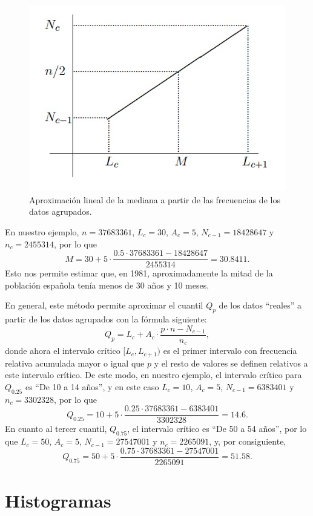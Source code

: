 \documentclass[]{book}
\theoremstyle{definition}
\theoremstyle{definition}
\theoremstyle{definition}
\theoremstyle{remark}
\begin{document}
\begin{figure}

{\centering \includegraphics[width=0.6\linewidth]{AprendeR-Parte-I_files/figure-html/median} 

}

\caption{Aproximación lineal de la mediana a partir de las frecuencias de los datos agrupados.}\label{fig:median}
\end{figure}

En nuestro ejemplo, \(n=37683361\), \(L_c=30\), \(A_c=5\), \(N_{c-1}=18428647\) y \(n_c=2455314\), por lo que
\[
M=30+5\cdot\frac{0.5\cdot 37683361-18428647}{2455314}= 30.8411.
\]
Esto nos permite estimar que, en 1981, aproximadamente la mitad de la población española tenía menos de 30 años y 10 meses.

En general, este método permite aproximar el cuantil \(Q_p\) de los datos ``reales'' a partir de los datos agrupados con la fórmula siguiente:
\[
Q_{p} =L_c + A_c \cdot \frac{p\cdot n-N_{c-1}}{n_c},
\]
donde ahora el intervalo crítico \([L_c,L_{c+1})\) es el primer intervalo con frecuencia relativa acumulada mayor o igual que \(p\)
y el resto de valores se definen relativos a este intervalo crítico.
De este modo, en nuestro ejemplo, el intervalo crítico para \(Q_{0.25}\) es ``De 10 a 14 años'', y en este caso \(L_c=10\), \(A_c=5\), \(N_{c-1}=6383401\) y \(n_c=3302328\), por lo que
\[
Q_{0.25}=10+5\cdot\frac{0.25\cdot 37683361-6383401}{3302328}= 14.6.
\]
En cuanto al tercer cuantil, \(Q_{0.75}\), el intervalo crítico es ``De 50 a 54 años'', por lo que \(L_c=50\), \(A_c=5\), \(N_{c-1}=27547001\) y \(n_c=2265091\), y, por consiguiente,
\[
Q_{0.75}=50+5\cdot\frac{0.75\cdot 37683361-27547001}{2265091}=51.58.
\]

\hypertarget{sec:hist}{%
\section{Histogramas}\label{sec:hist}}
\end{document}
